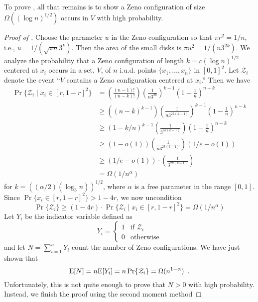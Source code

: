 \documentclass{patmorin}
\begin{document}
To prove , all that remains is to show a Zeno
configuration of size $\Omega((\log n)^{1/2})$ occurs in $V$ with high
probability.

\begin{proof}[Proof of ]
Choose the parameter $u$ in the Zeno configuration so that $\pi r^2=1/n$,
i.e., $u=1/(\sqrt{\pi n}3^k)$.  Then the area of the small disks is
$\pi u^2=1/(n3^{2k})$.
We analyze the probability that a Zeno configuration of length $k=c(\log
n)^{1/2}$ centered at $x_i$ occurs in a set, $V$, of $n$ i.u.d. points
$\{x_1,\ldots,x_n\}$ in
$[0,1]^2$.  Let $\mathcal{Z}_i$ denote the event ``$V$
contains a Zeno configuration centered at $x_i$.''  Then we have
\begin{align*}
 \Pr\{\mathcal{Z}_i\mid x_i\in[r,1-r]^2\} 
  & = \left(\frac{(n-1)!}{(n-k)!}\right) %
      \left(\frac{1}{n3^{2k}}\right)^{k-1}   %
      \left(1-\frac{1}{n}\right)^{n-k}   \\ %
  & \ge
      \left((n-k)^{k-1}\right) 
      \left(\frac{1}{n3^{2k(k-1)}}\right)^{k-1}  
      \left(1-\frac{1}{n}\right)^{n-k}   \\ 
  & \ge 
      (1-k/n)^{k-1} %
      \left(\frac{1}{3^{2k(k-1)}}\right)
      \left(1-\frac{1}{n}\right)^{n-k} \\
  & \ge
      \left(1-o(1)\right) 
      \left(\frac{1}{n3^{2k(k-1)}}\right)
      \left(1/e-o(1)\right)   \\ 
  & \ge (1/e-o(1)) \cdot \left(\frac{1}{3^{2k(k-1)}}\right) \\
  & = \Omega(1/n^{\alpha})
\end{align*}
for $k=((\alpha/2)(\log_3 n))^{1/2}$, where $\alpha$ is a free parameter in
the range $[0,1]$.  Since $\Pr\{x_i\in[r,1-r]^2\} > 1-4r$, we now
uncondition
\[
 \Pr\{\mathcal{Z}_i\} \ge  
    (1-4r)\cdot\Pr\{\mathcal{Z}_i\mid x_i\in[r,1-r]^2\}
    = \Omega(1/n^{\alpha})
\]
Let $Y_i$ be the indicator variable defined as
\[
   Y_i = \begin{cases} 1 & \text{if $\mathcal{Z}_i$} \\
                       0 & \text{otherwise} 
         \end{cases}
\]
and let $N=\sum_{i=1}^n Y_i$ count the number of Zeno configurations.  We
have just shown that 
\[
   \mathrm{E}[N] = n\mathrm{E}[Y_i] = n\Pr\{\mathcal{Z}_i\}=\Omega(n^{1-\alpha}) \enspace .
\]
Unfortunately, this is not quite enough to prove that $N>0$ with high
probability.  Instead, we finish the proof using the second moment method

\end{proof}
\end{document}
